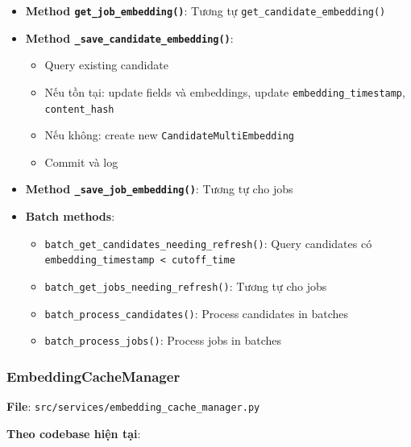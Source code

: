 \begin{itemize}
    \item \textbf{Method \texttt{get\_job\_embedding()}}: Tương tự \texttt{get\_candidate\_embedding()}
    
    \item \textbf{Method \texttt{\_save\_candidate\_embedding()}}:
    \begin{itemize}
        \item Query existing candidate
        \item Nếu tồn tại: update fields và embeddings, update \texttt{embedding\_timestamp}, \texttt{content\_hash}
        \item Nếu không: create new \texttt{CandidateMultiEmbedding}
        \item Commit và log
    \end{itemize}
    
    \item \textbf{Method \texttt{\_save\_job\_embedding()}}: Tương tự cho jobs
    
    \item \textbf{Batch methods}:
    \begin{itemize}
        \item \texttt{batch\_get\_candidates\_needing\_refresh()}: Query candidates có \texttt{embedding\_timestamp < cutoff\_time}
        \item \texttt{batch\_get\_jobs\_needing\_refresh()}: Tương tự cho jobs
        \item \texttt{batch\_process\_candidates()}: Process candidates in batches
        \item \texttt{batch\_process\_jobs()}: Process jobs in batches
    \end{itemize}
\end{itemize}

\subsubsection{EmbeddingCacheManager}

\textbf{File}: \texttt{src/services/embedding\_cache\_manager.py}

\textbf{Theo codebase hiện tại}:


